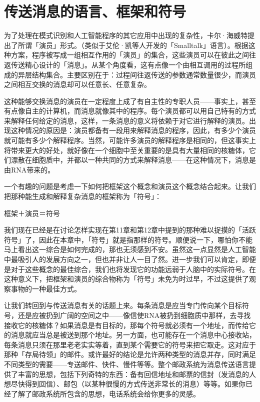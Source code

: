 \documentclass[
  12pt,
  twoside,
  openright,
  oldfontcommands,
]{memoir}
\begin{document}
\section{传送消息的语言、框架和符号}

为了处理在模式识别和人工智能程序的其它应用中出现的复杂性，卡尔·海威特提出了所谓「演员」形式。（类似于艾伦·凯等人开发的「Smalltalk」语言）。根据这种方案，程序被写成一组相互作用的「演员」的集合，这些演员可以在彼此之间往返传送精心设计的「消息」。从某个角度看，这有点像一个由相互调用的过程所组成的异层结构集合。主要区别在于：过程间往返传送的参数通常数量很少，而演员之间相互交换的消息却可以任意长、任意复杂。

这种能够交换消息的演员在一定程度上成了有自主性的专职人员------事实上，甚至有点像自主的计算机，而消息就像其中的程序。每个演员都可以用自己特有的方式来解释任何给定的消息，这样，一条消息的意义将依赖于对它进行解释的演员。出现这种情况的原因是：演员都备有一段用来解释消息的程序，因此，有多少个演员就可能有多少个解释程序。当然，可能许多演员的解释程序是相同的，但这事实上将带来更大的好处，就好像在一个细胞中至关重要的是具有大量相同的核糖体，它们漂散在细胞质中，并都以一种共同的方式来解释消息------在这种情况下，消息是由RNA带来的。

一个有趣的问题是考虑一下如何把框架这个概念和演员这个概念结合起来。让我们把那种能生成和解释复杂消息的框架称为「符号」：

框架＋演员＝符号

我们现在已经是在讨论怎样实现在第11章和第12章中提到的那种难以捉摸的「活跃符号」了，因此在本章中，「符号」就是指那样的符号。顺便说一下，哪怕你不能马上看出这一综合是如何完成的，那也无须感到不安。虽然这一点显然是人工智能中最吸引人的发展方向之一，但也并非让人一目了然。进一步我们可以肯定，即便是对于这些概念的最佳综合，我们也将发现它的功能远弱于人脑中的实际符号。在这种意义下，把框架和演员的综合物称为「符号」未免为时过早，不过这提供了观察事物的一种最佳方式。

让我们转回到与传送消息有关的话题上来。每条消息是应当专门传向某个目标符号，还是应被扔到广阔的空间之中------像信使RNA被扔到细胞质中那样，去寻找接收它的核糖体？如果消息是有目标的，那每个符号就必须有一个地址，而传给它的消息就应当总是被送到那个地址。另一方面，也可能存在一个消息中心接收站，每条消息只须在那里老老实实等着，直到某个需要它的符号来把它取走。这对应于那种「存局待领」的邮件。或许最好的结论是允许两种类型的消息并存，同时满足不同类型的需要------专送邮件、快件、慢件等等。整个邮政系统为消息传送语言提供了丰富的思想，包括下列奇特的东西：备有回信地址和邮票的信封（发消息的人想尽快得到回信）、邮包（以某种很慢的方式传送非常长的消息）等等。如果你已经了解了邮政系统所包含的思想，电话系统会给你更多的灵感。
\end{document}
